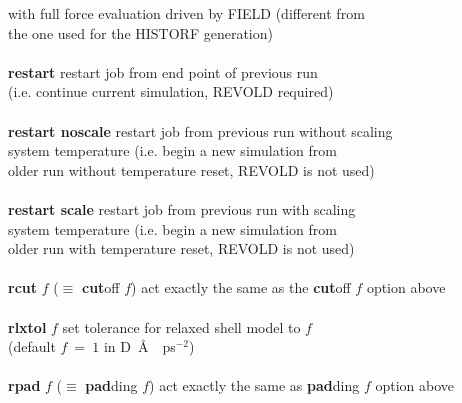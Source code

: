 \begin{tabbing}
\>                                              \> with full force evaluation driven by FIELD (different from \\
\>                                              \> the one used for the HISTORF generation) \\
\>                                              \> \\
\> {\bf restart}                                \> restart job from end point of previous run \\
\>                                              \> (i.e. continue current simulation, REVOLD required) \\
\>                                              \> \\
\> {\bf restart noscale}                        \> restart job from previous run without scaling \\
\>                                              \> system temperature (i.e. begin a new simulation from \\
\>                                              \> older run without temperature reset, REVOLD is not used) \\
\>                                              \> \\
\> {\bf restart scale}                          \> restart job from previous run with scaling \\
\>                                              \> system temperature (i.e. begin a new simulation from \\
\>                                              \> older run with temperature reset, REVOLD is not used) \\
\>                                              \> \\
\> {\bf rcut} $f$  ($\equiv$ {\bf cut}off $f$)  \> act exactly the same as the {\bf cut}off $f$ option above \\
\>                                              \> \\
\> {\bf rlxtol} $f$                             \> set tolerance for relaxed shell model to $f$ \\
\>                                              \> (default $f~=~1$ in D~\AA~~ps$^{-2}$) \\
\>                                              \> \\
\> {\bf rpad} $f$  ($\equiv$ {\bf pad}ding $f$) \> act exactly the same as {\bf pad}ding $f$ option above \\
\>                                              \> \\

\end{tabbing}
